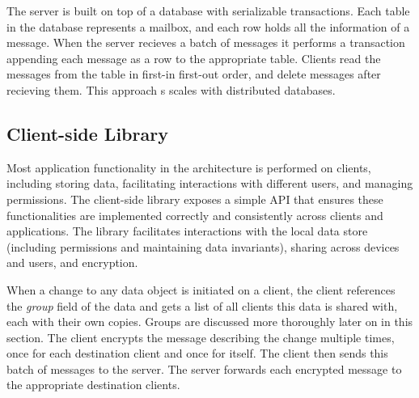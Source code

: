 The \name{} server is built on top of a database with serializable 
transactions. Each table in the database represents a mailbox, and each row
holds all the information of a message. When the server recieves a batch of 
messages it performs a transaction appending each message as a row to the 
appropriate table. Clients read the messages from the table in first-in 
first-out order, and delete messages after recieving them. This approach s
scales with distributed databases. 



\subsection{Client-side Library}





Most application functionality in the \name{} architecture is performed on 
clients, including storing data, facilitating interactions with different users, 
and managing permissions. The \name{} client-side library exposes a simple API 
that ensures these functionalities are implemented correctly and consistently 
across clients and applications. The library facilitates interactions with the 
local data store (including permissions and maintaining data invariants), 
sharing across devices and users, and encryption.  


When a change to any data object is initiated on a client, the client references 
the \textit{group} field of the data and gets a list of all clients this data is 
shared with, each with their own copies. Groups are discussed more thoroughly 
later on in this section. The client encrypts the message describing the change 
multiple times, once for each destination client and once for itself. The client 
then sends this batch of messages to the server. The server forwards each 
encrypted message to the appropriate destination clients. 

